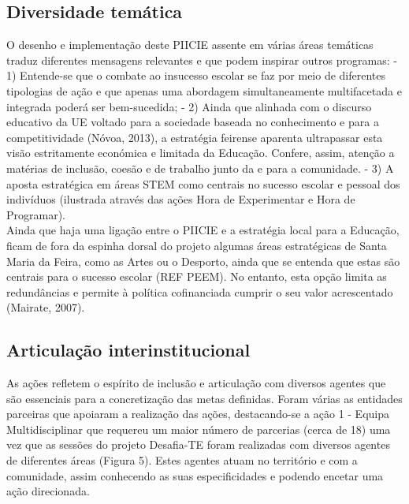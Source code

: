 \documentclass[
]{book}
\begin{document}
\hypertarget{diversidade-temuxe1tica}{%
\subsection{\texorpdfstring{\textbf{Diversidade temática}}{Diversidade temática}}\label{diversidade-temuxe1tica}}

O desenho e implementação deste PIICIE assente em várias áreas temáticas traduz diferentes mensagens relevantes e que podem inspirar outros programas:
- 1) Entende-se que o combate ao insucesso escolar se faz por meio de diferentes tipologias de ação e que apenas uma abordagem simultaneamente multifacetada e integrada poderá ser bem-sucedida;
- 2) Ainda que alinhada com o discurso educativo da UE voltado para a sociedade baseada no conhecimento e para a competitividade (Nóvoa, 2013), a estratégia feirense aparenta ultrapassar esta visão estritamente económica e limitada da Educação. Confere, assim, atenção a matérias de inclusão, coesão e de trabalho junto da e para a comunidade.
- 3) A aposta estratégica em áreas STEM como centrais no sucesso escolar e pessoal dos indivíduos (ilustrada através das ações Hora de Experimentar e Hora de Programar).\\
Ainda que haja uma ligação entre o PIICIE e a estratégia local para a Educação, ficam de fora da espinha dorsal do projeto algumas áreas estratégicas de Santa Maria da Feira, como as Artes ou o Desporto, ainda que se entenda que estas são centrais para o sucesso escolar (REF PEEM). No entanto, esta opção limita as redundâncias e permite à política cofinanciada cumprir o seu valor acrescentado (Mairate, 2007).

\hypertarget{articulauxe7uxe3o-interinstitucional}{%
\subsection{\texorpdfstring{\textbf{Articulação interinstitucional}}{Articulação interinstitucional}}\label{articulauxe7uxe3o-interinstitucional}}

As ações refletem o espírito de inclusão e articulação com diversos agentes que são essenciais para a concretização das metas definidas. Foram várias as entidades parceiras que apoiaram a realização das ações, destacando-se a ação 1 - Equipa Multidisciplinar que requereu um maior número de parcerias (cerca de 18) uma vez que as sessões do projeto Desafia-TE foram realizadas com diversos agentes de diferentes áreas (Figura 5). Estes agentes atuam no território e com a comunidade, assim conhecendo as suas especificidades e podendo encetar uma ação direcionada.
\end{document}
